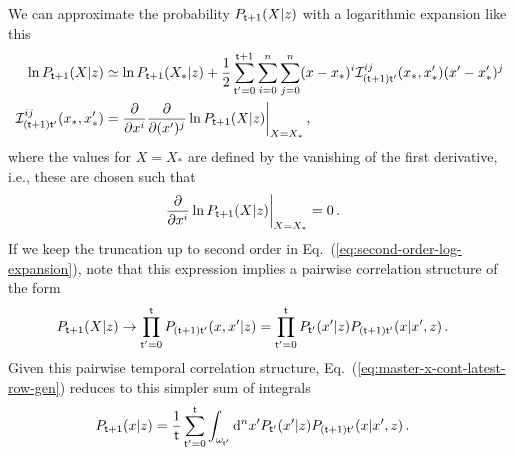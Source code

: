 We can approximate the probability $P_{{\sf t}+1}(X\vert z)$ with a logarithmic expansion like this
\begin{align}
\ln P_{{\sf t}+1}(X\vert z) &\simeq \ln P_{{\sf t}+1}(X_*\vert z) + \frac{1}{2}\sum_{{\sf t}'=0}^{{\sf t}+1}\sum_{i=0}^{n}\sum_{j=0}^{n} (x-x_*)^i {\cal I}^{ij}_{({\sf t}+1){\sf t}'}(x_*,x'_*) (x'-x'_*)^j \label{eq:second-order-log-expansion} \\
{\cal I}^{ij}_{({\sf t}+1){\sf t}'}(x_*,x'_*) &= \frac{\partial}{\partial x^i}\frac{\partial}{\partial (x')^j}\ln P_{{\sf t}+1}(X\vert z) \bigg\vert_{X=X_*} \,,
\end{align}
where the values for $X=X_*$ are defined by the vanishing of the first derivative, i.e., these are chosen such that
\begin{align}
\frac{\partial}{\partial x^i}\ln P_{{\sf t}+1}(X\vert z) \bigg\vert_{X=X_*} &= 0 \,.
\end{align}
If we keep the truncation up to second order in Eq.~(\ref{eq:second-order-log-expansion}), note that this expression implies a pairwise correlation structure of the form
\begin{align}
P_{{\sf t}+1}(X\vert z) &\rightarrow \prod_{{\sf t}'=0}^{{\sf t}}P_{({\sf t}+1){\sf t}'}(x,x'\vert z) = \prod_{{\sf t}'=0}^{{\sf t}}P_{{\sf t}'}(x'\vert z)P_{({\sf t}+1){\sf t}'}(x\vert x', z) \,.
\end{align}
Given this pairwise temporal correlation structure, Eq.~(\ref{eq:master-x-cont-latest-row-gen}) reduces to this simpler sum of integrals
\begin{align}
P_{{\sf t}+1}(x\vert z) &= \frac{1}{{\sf t}}\sum_{{\sf t}'=0}^{{\sf t}}\int_{\omega_{{\sf t}'}}{\rm d}^nx' P_{{\sf t}'}(x'\vert z)P_{({\sf t}+1){\sf t}'}(x\vert x',z) \label{eq:second-order-correl} \,.
\end{align}

